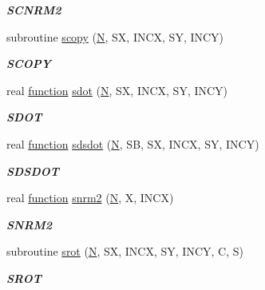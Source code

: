 \begin{DoxyCompactItemize}
\begin{DoxyCompactList}\small\item\em {\bfseries S\+C\+N\+R\+M2} \end{DoxyCompactList}\item 
subroutine \hyperlink{group__single__blas__level1_ga24785e467bd921df5a2b7300da57c469}{scopy} (\hyperlink{polmisc_8c_a0240ac851181b84ac374872dc5434ee4}{N}, S\+X, I\+N\+C\+X, S\+Y, I\+N\+C\+Y)
\begin{DoxyCompactList}\small\item\em {\bfseries S\+C\+O\+P\+Y} \end{DoxyCompactList}\item 
real \hyperlink{afunc_8m_a7b5e596df91eadea6c537c0825e894a7}{function} \hyperlink{group__single__blas__level1_ga37a14d8598319955b711af0d64a6f56e}{sdot} (\hyperlink{polmisc_8c_a0240ac851181b84ac374872dc5434ee4}{N}, S\+X, I\+N\+C\+X, S\+Y, I\+N\+C\+Y)
\begin{DoxyCompactList}\small\item\em {\bfseries S\+D\+O\+T} \end{DoxyCompactList}\item 
real \hyperlink{afunc_8m_a7b5e596df91eadea6c537c0825e894a7}{function} \hyperlink{group__single__blas__level1_gaddc89585ced76065053abffb322c5a22}{sdsdot} (\hyperlink{polmisc_8c_a0240ac851181b84ac374872dc5434ee4}{N}, S\+B, S\+X, I\+N\+C\+X, S\+Y, I\+N\+C\+Y)
\begin{DoxyCompactList}\small\item\em {\bfseries S\+D\+S\+D\+O\+T} \end{DoxyCompactList}\item 
real \hyperlink{afunc_8m_a7b5e596df91eadea6c537c0825e894a7}{function} \hyperlink{group__single__blas__level1_ga35c2ec0e9bfdaa545320c2a134fcc471}{snrm2} (\hyperlink{polmisc_8c_a0240ac851181b84ac374872dc5434ee4}{N}, X, I\+N\+C\+X)
\begin{DoxyCompactList}\small\item\em {\bfseries S\+N\+R\+M2} \end{DoxyCompactList}\item 
subroutine \hyperlink{group__single__blas__level1_ga0ce1ab4726eb7ad925cbd89f100d5ce0}{srot} (\hyperlink{polmisc_8c_a0240ac851181b84ac374872dc5434ee4}{N}, S\+X, I\+N\+C\+X, S\+Y, I\+N\+C\+Y, C, S)
\begin{DoxyCompactList}\small\item\em {\bfseries S\+R\+O\+T} \end{DoxyCompactList}\item 

\end{DoxyCompactItemize}
